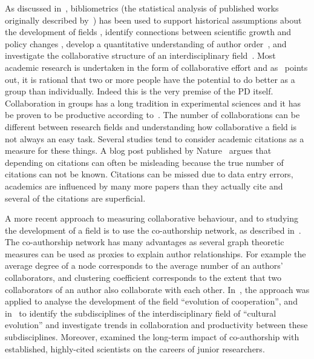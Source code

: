 \documentclass{article}
\theoremstyle{definition}
\begin{document}
As discussed in~\cite{youngblood2018}, bibliometrics (the statistical analysis
of published works originally described by~\cite{pritchard1969}) has been used
to support historical assumptions about the development of fields
\cite{raina1998}, identify connections between scientific growth and policy
changes \cite{das2016}, develop a quantitative understanding of author
order~\cite{sekara2018}, and investigate the collaborative structure of an
interdisciplinary field~\cite{Liu2015}. Most academic research is undertaken in
the form of collaborative effort and as~\cite{Kyvik2017} points out, it is
rational that two or more people have the potential to do better as a group
than individually. Indeed this is the very premise of the PD itself.
Collaboration in groups has a long tradition in experimental
sciences and it has be proven to be productive according
to~\cite{Etzkowitz1992}. The number of collaborations can be different
between research fields and understanding how collaborative a field is not
always an easy task. Several studies tend to consider academic citations as a
measure for these things. A blog post published by Nature~\cite{nature_blog}
argues that depending on citations can often be misleading because the true
number of citations can not be known. Citations can be missed due to data entry
errors, academics are influenced by many more papers than they actually cite and
several of the citations are superficial.

A more recent approach to measuring collaborative behaviour, and to studying the
development of a field is to use the co-authorship network, as described
in~\cite{Liu2015}. The co-authorship network has many advantages as several
graph theoretic measures can be used as proxies to explain author relationships.
For example the average degree of a node corresponds to the average number of
an authors' collaborators, and clustering coefficient corresponds to the extent that
two collaborators of an author also collaborate with each other.
In~\cite{Liu2015}, the approach was applied to analyse the development of the field
``evolution of cooperation'', and in~\cite{youngblood2018} to identify the
subdisciplines of the interdisciplinary field of ``cultural evolution'' and
investigate trends in collaboration and productivity between these subdisciplines.
Moreover, \cite{Li2019} examined the
long-term impact of co-authorship with established, highly-cited scientists on
the careers of junior researchers.
\end{document}
